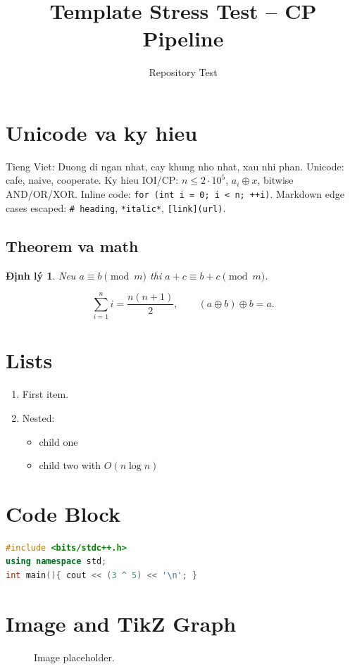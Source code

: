 \documentclass[12pt,a4paper]{article}
\newtheorem{theorem}{Định lý}
\begin{document}
\title{Template Stress Test -- CP Pipeline}
\author{Repository Test}
\maketitle
\tableofcontents
\newpage
\section{Unicode va ky hieu}
Tieng Viet: Duong di ngan nhat, cay khung nho nhat, xau nhi phan.
Unicode: cafe, naive, cooperate.
Ky hieu IOI/CP: $n \le 2\cdot 10^5$, $a_i \oplus x$, bitwise AND/OR/XOR.
Inline code: \texttt{for (int i = 0; i < n; ++i)}.
Markdown edge cases escaped: \texttt{\# heading}, \texttt{*italic*}, \texttt{[link](url)}.
\subsection{Theorem va math}
\begin{theorem}
Neu $a \equiv b \pmod m$ thi $a+c \equiv b+c \pmod m$.
\end{theorem}
\[\sum_{i=1}^{n} i = \frac{n(n+1)}{2},\qquad (a\oplus b)\oplus b=a.\]
\section{Lists}
\begin{enumerate}[leftmargin=*]
  \item First item.
  \item Nested:
  \begin{itemize}[leftmargin=*]
    \item child one
    \item child two with $O(n\log n)$
  \end{itemize}
\end{enumerate}
\section{Code Block}
\begin{lstlisting}[language=C++]
#include <bits/stdc++.h>
using namespace std;
int main(){ cout << (3 ^ 5) << '\n'; }
\end{lstlisting}
\section{Image and TikZ Graph}
\begin{figure}[H]\centering\fbox{\rule{0pt}{2cm}\rule{3cm}{0pt}}\caption{Image placeholder.}\end{figure}
\begin{center}
\end{center}
\end{document}
